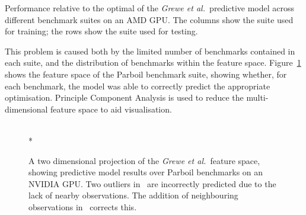 \begin{table}
	\centering
	
  \caption[Cross-validation of benchmark suites on a predictive model]{Performance relative to the optimal of the \emph{Grewe et al.\ }predictive model across different benchmark suites on an AMD GPU. The columns show the suite used for training; the rows show the suite used for testing.}
  \label{tab:cpu-gpu-benchmarks-crossvalidate}
\end{table}

This problem is caused both by the limited number of benchmarks contained in each suite, and the distribution of benchmarks within the feature space. Figure~\ref{fig:pca-benchmarks} shows the feature space of the Parboil benchmark suite, showing whether, for each benchmark, the model was able to correctly predict the appropriate optimisation.  Principle Component Analysis is used to reduce the multi-dimensional feature space to aid visualisation.

\begin{figure}
	\centering
  \\*
	\caption[Identifying and correcting outliers in a benchmark suite]{A two dimensional projection of the \emph{Grewe et al.\ }feature space, showing predictive model results over Parboil benchmarks on an NVIDIA GPU. Two outliers in~\protect{} are incorrectly predicted due to the lack of nearby observations. The addition of neighbouring observations in~\protect{} corrects this.}%
	\label{fig:pca-benchmarks}
\end{figure}

